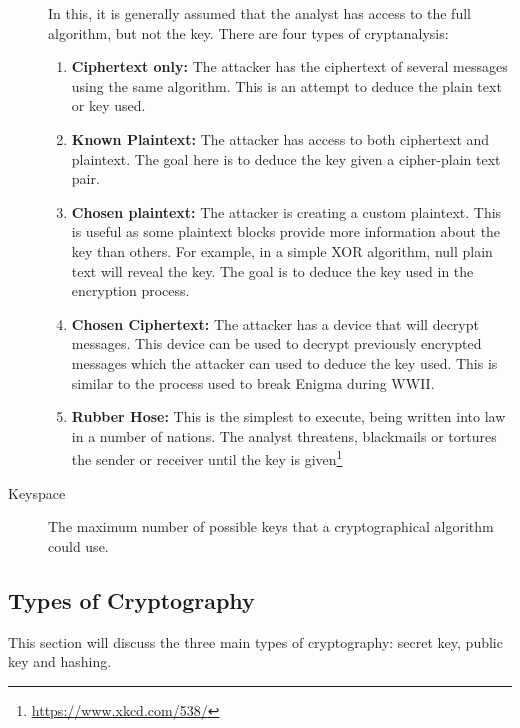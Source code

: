 \begin{description}
					In this, it is generally assumed that the analyst has access to the full algorithm, but not the key. 
					There are four types of cryptanalysis: 
					\begin{enumerate}
						\item \textbf{Ciphertext only:} The attacker has the ciphertext of several messages using the same algorithm. 
							This is an attempt to deduce the plain text or key used. 
						\item \textbf{Known Plaintext:} The attacker has access to both ciphertext and plaintext. 
							The goal here is to deduce the key given a cipher-plain text pair. 
						\item \textbf{Chosen plaintext:} The attacker is creating a custom plaintext. 
							This is useful as some plaintext blocks provide more information about the key than others. 
							For example, in a simple XOR algorithm, null plain text will reveal the key. 
							The goal is to deduce the key used in the encryption process. 
						\item \textbf{Chosen Ciphertext:} The attacker has a device that will decrypt messages. 
							This device can be used to decrypt previously encrypted messages which the attacker can used to deduce the key used. 
							This is similar to the process used to break Enigma during WWII. 
						\item \textbf{Rubber Hose:} This is the simplest to execute, being written into law in a number of nations.
							The analyst threatens, blackmails or tortures the sender or receiver until the key is given\footnote{\url{https://www.xkcd.com/538/}}
					\end{enumerate}
				\item[Keyspace] The maximum number of possible keys that a cryptographical algorithm could use. 
			\end{description}
		\subsection{Types of Cryptography}
			This section will discuss the three main types of cryptography: secret key, public key and hashing. 

